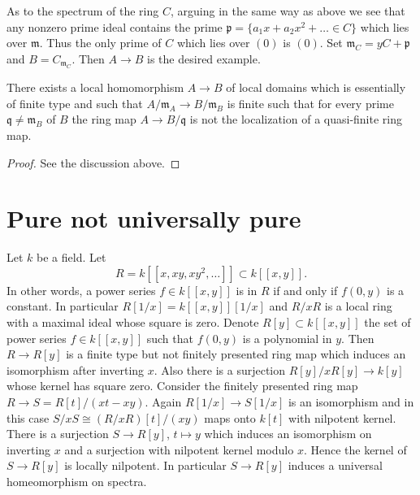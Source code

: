 \medskip\noindent
As to the spectrum of the ring $C$, arguing in the same way as above
we see that any nonzero prime ideal contains the prime
$\mathfrak p = \{a_1 x + a_2 x^2 + \ldots \in C\}$ which lies
over $\mathfrak m$. Thus the only prime of $C$ which lies over
$(0)$ is $(0)$. Set $\mathfrak m_C = yC + \mathfrak p$ and
$B = C_{\mathfrak m_C}$. Then $A \to B$ is the desired example.

\begin{lemma}
\label{lemma-topology-finite-type}
There exists a local homomorphism $A \to B$ of local domains which is
essentially of finite type and such that $A/\mathfrak m_A \to B/\mathfrak m_B$
is finite such that for every prime
$\mathfrak q \not = \mathfrak m_B$ of $B$ the ring map
$A \to B/\mathfrak q$ is not the localization of a quasi-finite ring map.
\end{lemma}

\begin{proof}
See the discussion above.
\end{proof}



\section{Pure not universally pure}
\label{section-pure-not-universally}

\noindent
Let $k$ be a field. Let
$$
R = k[[x, xy, xy^2, \ldots]] \subset k[[x, y]].
$$
In other words, a power series $f \in k[[x, y]]$ is in $R$ if and only
if $f(0, y)$ is a constant. In particular $R[1/x] = k[[x, y]][1/x]$
and $R/xR$ is a local ring with a maximal ideal whose square
is zero. Denote $R[y] \subset k[[x, y]]$ the set of power series
$f \in k[[x, y]]$ such that $f(0, y)$ is a polynomial in $y$. Then
$R \to R[y]$ is a finite type but not finitely presented ring map
which induces an isomorphism after inverting $x$. Also there is a
surjection $R[y]/xR[y] \to k[y]$ whose kernel has square zero. Consider
the finitely presented ring map $R \to S = R[t]/(xt - xy)$.
Again $R[1/x] \to S[1/x]$ is an isomorphism and in this case
$S/xS \cong (R/xR)[t]/(xy)$ maps onto $k[t]$ with nilpotent kernel.
There is a surjection $S \to R[y]$, $t \longmapsto y$ which induces
an isomorphism on inverting $x$ and a surjection with nilpotent kernel
modulo $x$. Hence the kernel of $S \to R[y]$ is locally nilpotent.
In particular $S \to R[y]$ induces a universal homeomorphism on spectra.

